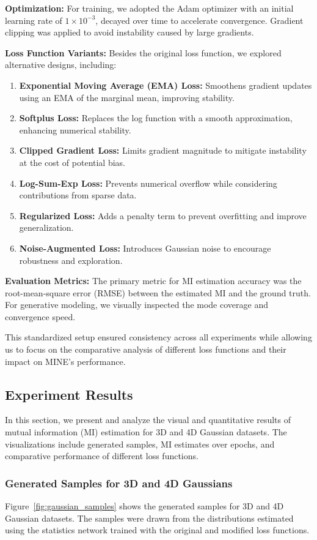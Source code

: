 \documentclass[lettersize,journal]{IEEEtran}
\begin{document}
\textbf{Optimization:} For training, we adopted the Adam optimizer with an initial learning rate of $1 \times 10^{-3}$, decayed over time to accelerate convergence. Gradient clipping was applied to avoid instability caused by large gradients.
    
\textbf{Loss Function Variants:} Besides the original loss function, we explored alternative designs, including:
    \begin{enumerate}
        \item \textbf{Exponential Moving Average (EMA) Loss:} Smoothens gradient updates using an EMA of the marginal mean, improving stability.
        \item \textbf{Softplus Loss:} Replaces the log function with a smooth approximation, enhancing numerical stability.
        \item \textbf{Clipped Gradient Loss:} Limits gradient magnitude to mitigate instability at the cost of potential bias.
        \item \textbf{Log-Sum-Exp Loss:} Prevents numerical overflow while considering contributions from sparse data.
        \item \textbf{Regularized Loss:} Adds a penalty term to prevent overfitting and improve generalization.
        \item \textbf{Noise-Augmented Loss:} Introduces Gaussian noise to encourage robustness and exploration.
    \end{enumerate}
    
\textbf{Evaluation Metrics:} The primary metric for MI estimation accuracy was the root-mean-square error (RMSE) between the estimated MI and the ground truth. For generative modeling, we visually inspected the mode coverage and convergence speed.

This standardized setup ensured consistency across all experiments while allowing us to focus on the comparative analysis of different loss functions and their impact on MINE's performance.

\subsection{Experiment Results}
In this section, we present and analyze the visual and quantitative results of mutual information (MI) estimation for 3D and 4D Gaussian datasets. The visualizations include generated samples, MI estimates over epochs, and comparative performance of different loss functions.

\subsubsection{Generated Samples for 3D and 4D Gaussians}
Figure~\ref{fig:gaussian_samples} shows the generated samples for 3D and 4D Gaussian datasets. The samples were drawn from the distributions estimated using the statistics network trained with the original and modified loss functions.
\end{document}
